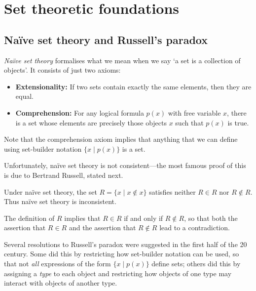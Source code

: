 \section{Set theoretic foundations}

\subsection*{Na\"{i}ve set theory and Russell's paradox}

\textit{Na\"{i}ve set theory} formalises what we mean when we say `a set is a collection of objects'. It consists of just two axioms:
\begin{itemize}
\item \textbf{Extensionality:} If two sets contain exactly the same elements, then they are equal.
\item \textbf{Comprehension:} For any logical formula $p(x)$ with free variable $x$, there is a set whose elements are precisely those objects $x$ such that $p(x)$ is true.
\end{itemize}

Note that the comprehension axiom implies that anything that we can define using set-builder notation $\{ x \mid p(x) \}$ is a set.

Unfortunately, na\"{i}ve set theory is not consistent---the most famous proof of this is due to Bertrand Russell, stated next.

\begin{theorem}
\label{thmRussellsParadox}
Under na\"{i}ve set theory, the set $R = \{ x \mid x \not\in x \}$ satisfies neither $R \in R$ nor $R \not\in R$. Thus na\"{i}ve set theory is inconsistent.
\end{theorem}

\begin{cproof}
The definition of $R$ implies that $R \in R$ if and only if $R \not\in R$, so that both the assertion that $R \in R$ and the assertion that $R \not\in R$ lead to a contradiction.
\end{cproof}

Several resolutions to Russell's paradox were suggested in the first half of the 20\supth{} century. Some did this by restricting how set-builder notation can be used, so that not \textit{all} expressions of the form $\{ x \mid p(x) \}$ define sets; others did this by assigning a \textit{type} to each object and restricting how objects of one type may interact with objects of another type.

